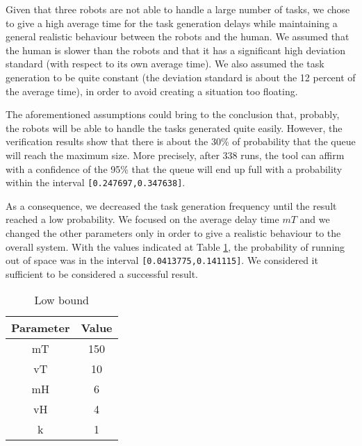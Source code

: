 Given that three robots are not able to handle a large number of tasks, we chose to give a high average time for the task generation delays while maintaining a general realistic behaviour between the robots and the human. We assumed that the human is slower than the robots and that it has a significant high deviation standard (with respect to its own average time). We also assumed the task generation to be quite constant (the deviation standard is about the 12 percent of the average time), in order to avoid creating a situation too floating.

The aforementioned assumptions could bring to the conclusion that, probably, the robots will be able to handle the tasks generated quite easily. However, the verification results show that there is about the 30\% of probability that the queue will reach the maximum size. More precisely, after 338 runs, the tool can affirm with a confidence of the 95\% that the queue will end up full with a probability within the interval \texttt{[0.247697,0.347638]}.

As a consequence, we decreased the task generation frequency until the result reached a low probability. We focused on the average delay time $mT$ and we changed the other parameters only in order to give a realistic behaviour to the overall system. With the values indicated at Table \ref{tab:lowbound}, the probability of running out of space was in the interval \texttt{[0.0413775,0.141115]}. We considered it sufficient to be considered a successful result.

\begin{table}[h]
    \centering
        \begin{tabular}{|c c|} 
            \hline
            Parameter & Value \\ [0.5ex] 
            \hline\hline
            mT & 150 \\
            vT & 10 \\
            mH & 6 \\
            vH & 4 \\
            k & 1 \\ [0.5ex] 
            \hline
        \end{tabular}
        \caption{Low bound}
        \label{tab:lowbound}
\end{table}

